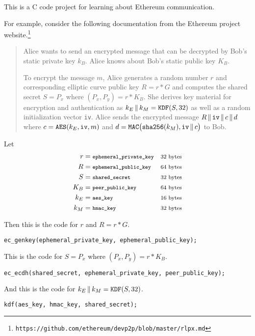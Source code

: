 \documentclass[12pt]{article}
\begin{document}
This is a C code project for learning about Ethereum communication.

\bigskip
For example, consider the following documentation
from the Ethereum project website.\footnote{\tt https://github.com/ethereum/devp2p/blob/master/rlpx.md}

\begin{quote}
Alice wants to send an encrypted message that can be decrypted by Bob's static private key $k_B$.
Alice knows about Bob's static public key $K_B$.

\medskip
To encrypt the message $m$, Alice generates a random number $r$
and corresponding elliptic curve public key $R=r*G$ and computes the
shared secret $S=P_x$ where $(P_x,P_y)=r*K_B$.
She derives key material for encryption and authentication as
$k_E\,\|\,k_M=\text{\tt KDF}(S,32)$
as well as a random initialization vector \verb$iv$.
Alice sends the encrypted message $R\,\|\,\text{\tt iv}\,\|\,c\,\|\,d$
where $c=\text{\tt AES}(k_E,\text{\tt iv},m)$
and $d=\text{\tt MAC}\big(\text{\tt sha256}(k_M),\text{\tt iv}\,\|\,c\big)$ to Bob.
\end{quote}

Let
\begin{align*}
r&=\text{\footnotesize\tt ephemeral\_private\_key} & \text{\footnotesize 32 bytes}
\\
R&=\text{\footnotesize\tt ephemeral\_public\_key} & \text{\footnotesize 64 bytes}
\\
S&=\text{\footnotesize\tt shared\_secret} & \text{\footnotesize 32 bytes}
\\
K_B&=\text{\footnotesize\tt peer\_public\_key} & \text{\footnotesize 64 bytes}
\\
k_E&=\text{\footnotesize\tt aes\_key} & \text{\footnotesize 16 bytes}
\\
k_M&=\text{\footnotesize\tt hmac\_key} & \text{\footnotesize 32 bytes}
\end{align*}

Then this is the code for $r$ and $R=r*G$.
{\footnotesize
\begin{verbatim}
ec_genkey(ephemeral_private_key, ephemeral_public_key);
\end{verbatim}
}

\bigskip
This is the code for $S=P_x$ where $(P_x,P_y)=r*K_B$.
{\footnotesize
\begin{verbatim}
ec_ecdh(shared_secret, ephemeral_private_key, peer_public_key);
\end{verbatim}
}

\bigskip
And this is the code for $k_E\,\|\,k_M=\text{\tt KDF}(S,32)$.
{\footnotesize
\begin{verbatim}
kdf(aes_key, hmac_key, shared_secret);
\end{verbatim}
}
\end{document}
